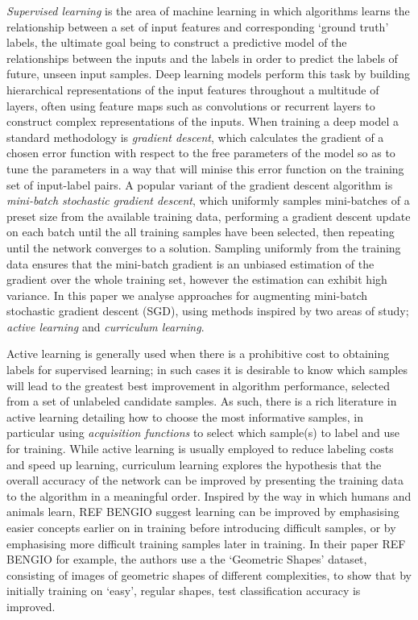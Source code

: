 \textit{Supervised learning} is the area of machine learning in which algorithms learns the relationship between a set of input features and corresponding `ground truth' labels, the ultimate goal being to construct a predictive model of the relationships between the inputs and the labels in order to predict the labels of future, unseen input samples. Deep learning models perform this task by building hierarchical representations of the input features throughout a multitude of layers, often using feature maps such as convolutions or recurrent layers to construct complex representations of the inputs. When training a deep model a standard methodology is \textit{gradient descent}, which calculates the gradient of a chosen error function with respect to the free parameters of the model so as to tune the parameters in a way that will minise this error function on the training set of input-label pairs. A popular variant of the gradient descent algorithm is \textit{mini-batch stochastic gradient descent}, which uniformly samples mini-batches of a preset size from the available training data, performing a gradient descent update on each batch until the all training samples have been selected, then repeating until the network converges to a solution. Sampling uniformly from the training data ensures that the mini-batch gradient is an unbiased estimation of the gradient over the whole training set, however the estimation can exhibit high variance. In this paper we analyse approaches for augmenting mini-batch stochastic gradient descent (SGD), using methods inspired by two areas of study; \textit{active learning} and \textit{curriculum learning}. 

Active learning is generally used when there is a prohibitive cost to obtaining labels for supervised learning; in such cases it is desirable to know which samples will lead to the greatest best improvement in algorithm performance, selected from a set of unlabeled candidate samples. As such, there is a rich literature in active learning detailing how to choose the most informative samples, in particular using \textit{acquisition functions} to select which sample(s) to label and use for training. While active learning is usually employed to reduce labeling costs and speed up learning, curriculum learning explores the hypothesis that the overall accuracy of the network can be improved by presenting the training data to the algorithm in a meaningful order. Inspired by the way in which humans and animals learn, REF BENGIO suggest learning can be improved by emphasising easier concepts earlier on in training before introducing difficult samples, or by emphasising more difficult training samples later in training. In their paper REF BENGIO for example, the authors use a the `Geometric Shapes' dataset, consisting of images of geometric shapes of different complexities, to show that by initially training on `easy', regular shapes, test classification accuracy is improved. 

